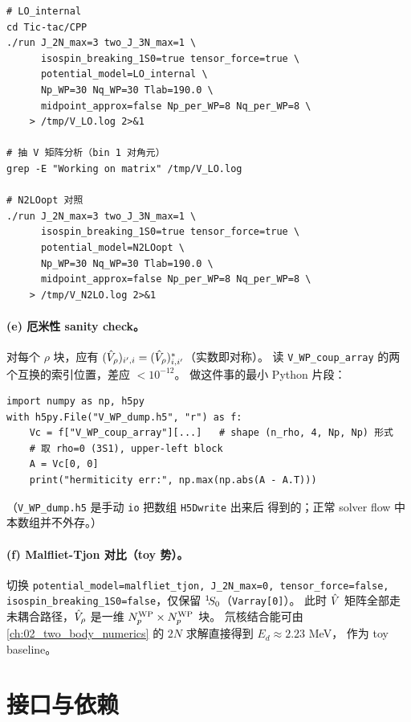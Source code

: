 \begin{numericalbox}[label={box:ch08-numerical-closure}]
\begin{lstlisting}[style=config]
# LO_internal
cd Tic-tac/CPP
./run J_2N_max=3 two_J_3N_max=1 \
      isospin_breaking_1S0=true tensor_force=true \
      potential_model=LO_internal \
      Np_WP=30 Nq_WP=30 Tlab=190.0 \
      midpoint_approx=false Np_per_WP=8 Nq_per_WP=8 \
    > /tmp/V_LO.log 2>&1

# 抽 V 矩阵分析（bin 1 对角元）
grep -E "Working on matrix" /tmp/V_LO.log

# N2LOopt 对照
./run J_2N_max=3 two_J_3N_max=1 \
      isospin_breaking_1S0=true tensor_force=true \
      potential_model=N2LOopt \
      Np_WP=30 Nq_WP=30 Tlab=190.0 \
      midpoint_approx=false Np_per_WP=8 Nq_per_WP=8 \
    > /tmp/V_N2LO.log 2>&1
\end{lstlisting}

\paragraph{(e) 厄米性 sanity check。}
对每个 \(\rho\) 块，应有 \((\hat{V}_\rho)_{i', i} = (\hat{V}_\rho)_{i, i'}^*\)（实数即对称）。
读 \texttt{V\_WP\_coup\_array} 的两个互换的索引位置，差应 \(< 10^{-12}\)。
做这件事的最小 Python 片段：
\begin{lstlisting}[style=python]
import numpy as np, h5py
with h5py.File("V_WP_dump.h5", "r") as f:
    Vc = f["V_WP_coup_array"][...]   # shape (n_rho, 4, Np, Np) 形式
    # 取 rho=0 (3S1), upper-left block
    A = Vc[0, 0]
    print("hermiticity err:", np.max(np.abs(A - A.T)))
\end{lstlisting}
（\texttt{V\_WP\_dump.h5} 是手动 \texttt{io} 把数组 \texttt{H5Dwrite} 出来后
得到的；正常 solver flow 中本数组并不外存。）

\paragraph{(f) Malfliet-Tjon 对比（toy 势）。}
切换 \texttt{potential\_model=malfliet\_tjon, J\_2N\_max=0, tensor\_force=false,
isospin\_breaking\_1S0=false}，仅保留 \({}^{1}\!S_{0}\)（\texttt{Varray[0]}）。
此时 \(\hat{V}\) 矩阵全部走未耦合路径，\(\hat{V}_\rho\) 是一维 \({N_{p}^{\text{WP}}} \times {N_{p}^{\text{WP}}}\) 块。
氘核结合能可由 \cref{ch:02_two_body_numerics} 的 \(2N\) 求解直接得到 \(E_d \approx 2.23\) MeV，
作为 toy baseline。

\end{numericalbox}

\section{接口与依赖}
\label{sec:ch08-interface}


